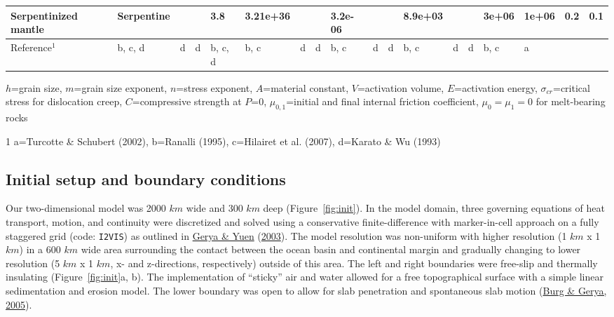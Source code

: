 \documentclass[draft,linenumbers]{agujournal2018}
\begin{document}
\begin{landscape}
\begin{table}
{\begin{threeparttable}
\begin{tabular}[t]{llllllllllllllllll}
\addlinespace
Serpentinized mantle & Serpentine &  &  & 3.8 & 3.21e+36 &  &  & 3.2e-06 &  &  & 8.9e+03 &  &  & 3e+06 & 1e+06 & 0.2 & 0.1\\
\midrule
Reference$^1$ & b, c, d & d & d & b, c, d & b, c & d & d & b, c & d & d & b, c & d & d & b, c & a &  & \\
\bottomrule
\end{tabular}
\begin{tablenotes}
\item $h$=grain size, $m$=grain size exponent, $n$=stress exponent, $A$=material constant, $V$=activation volume, $E$=activation energy, $\sigma_{cr}$=critical stress for dislocation creep, $C$=compressive strength at $P$=0, $\mu_{0,1}$=initial and final internal friction coefficient, $\mu_0=\mu_1=0$ for melt-bearing rocks
\item[1] a=Turcotte \& Schubert (2002), b=Ranalli (1995), c=Hilairet et al. (2007), d=Karato \& Wu (1993)
\end{tablenotes}
\end{threeparttable}}
\end{table}
\end{landscape}

\hypertarget{initial-setup-and-boundary-conditions}{%
\subsection{Initial setup and boundary
conditions}\label{initial-setup-and-boundary-conditions}}

Our two-dimensional model was 2000 \(km\) wide and 300 \(km\) deep
(Figure~\ref{fig:init}). In the model domain, three governing equations
of heat transport, motion, and continuity were discretized and solved
using a conservative finite-difference with marker-in-cell approach on a
fully staggered grid (code: \texttt{I2VIS}) as outlined in
\protect\hyperlink{ref-Gerya2003}{Gerya \& Yuen}
(\protect\hyperlink{ref-Gerya2003}{2003}). The model resolution was
non-uniform with higher resolution (1 \(km\) x 1 \(km\)) in a 600 \(km\)
wide area surrounding the contact between the ocean basin and
continental margin and gradually changing to lower resolution (5 \(km\)
x 1 \(km\), x- and z-directions, respectively) outside of this area. The
left and right boundaries were free-slip and thermally insulating
(Figure~\ref{fig:init}a, b). The implementation of ``sticky'' air and
water allowed for a free topographical surface with a simple linear
sedimentation and erosion model. The lower boundary was open to allow
for slab penetration and spontaneous slab motion
(\protect\hyperlink{ref-Burg2005}{Burg \& Gerya, 2005}).
\end{document}
